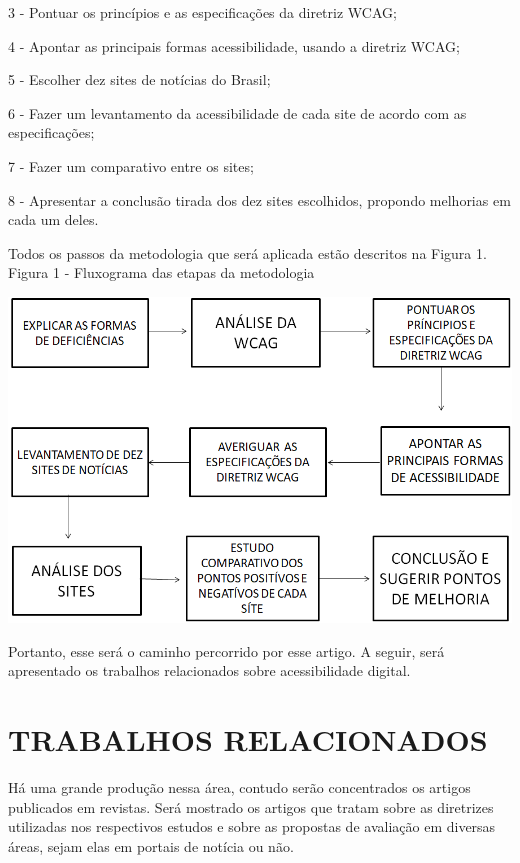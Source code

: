 \documentclass[a4paper]{article}
\begin{document}
\begin{titlepage}
3 - Pontuar os princípios e as especificações da diretriz WCAG;

4 - Apontar as principais formas acessibilidade, usando a diretriz WCAG;

5 - Escolher dez sites de notícias do Brasil;

6 - Fazer um levantamento da acessibilidade de cada site de acordo com as especificações;

7 - Fazer um comparativo entre os sites;

8 - Apresentar a conclusão tirada dos dez sites escolhidos, propondo melhorias em cada um deles.

Todos os passos da metodologia que será aplicada estão descritos na Figura 1.\\

Figura 1 - Fluxograma das etapas da metodologia\\[-0.7cm]
\begin{center}
	\parbox{10cm}{\includegraphics[scale=0.4]{Fluxograma - Metodologia TCC.png}}
\end{center}

Portanto, esse será o caminho percorrido por esse artigo. A seguir, será apresentado os trabalhos relacionados sobre acessibilidade digital.

\section{TRABALHOS RELACIONADOS}
Há uma grande produção nessa área, contudo serão concentrados os artigos publicados em revistas. Será mostrado os artigos que tratam sobre as diretrizes utilizadas nos respectivos estudos e sobre as propostas de avaliação em diversas áreas, sejam elas em portais de notícia ou não.


\end{titlepage}
\end{document}
